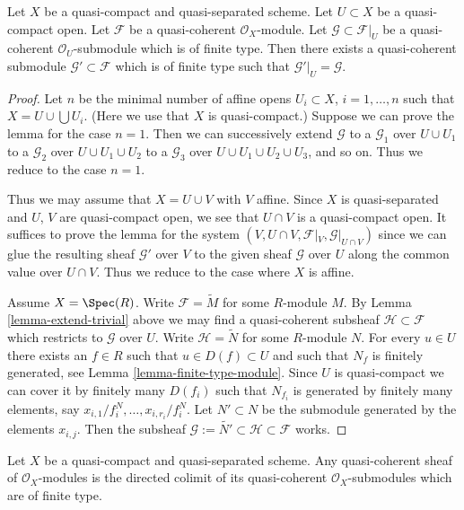 \begin{lemma}
\label{lemma-extend}
Let $X$ be a quasi-compact and quasi-separated scheme.
Let $U \subset X$ be a quasi-compact open.
Let $\mathcal{F}$ be a quasi-coherent $\mathcal{O}_X$-module.
Let $\mathcal{G} \subset \mathcal{F}|_U$ be a quasi-coherent
$\mathcal{O}_U$-submodule which is of finite type. Then
there exists a quasi-coherent submodule $\mathcal{G}' \subset \mathcal{F}$
which is of finite type such that $\mathcal{G}'|_U = \mathcal{G}$.
\end{lemma}

\begin{proof}
Let $n$ be the minimal number of affine opens $U_i \subset X$,
$i = 1, \ldots , n$ such that $X = U \cup \bigcup U_i$.
(Here we use that $X$ is quasi-compact.) Suppose
we can prove the lemma for the case $n = 1$. Then we can successively
extend $\mathcal{G}$
to a $\mathcal{G}_1$ over $U \cup U_1$
to a $\mathcal{G}_2$ over $U \cup U_1 \cup U_2$
to a $\mathcal{G}_3$ over $U \cup U_1 \cup U_2 \cup U_3$,
and so on.
Thus we reduce to the case $n = 1$.

\medskip\noindent
Thus we may assume that $X = U \cup V$ with $V$ affine.
Since $X$ is quasi-separated and $U$, $V$ are quasi-compact open,
we see that $U \cap V$ is a quasi-compact open. It suffices to prove the
lemma for the system $(V, U \cap V, \mathcal{F}|_V, \mathcal{G}|_{U \cap V})$
since we can glue the resulting sheaf $\mathcal{G}'$ over $V$
to the given sheaf $\mathcal{G}$ over $U$ along the common value
over $U \cap V$.
Thus we reduce to the case where $X$ is affine.

\medskip\noindent
Assume $X = \Spec(R)$. Write $\mathcal{F} = \widetilde M$
for some $R$-module $M$. By Lemma \ref{lemma-extend-trivial} above we may
find a quasi-coherent subsheaf $\mathcal{H} \subset \mathcal{F}$
which restricts to $\mathcal{G}$ over $U$.
Write $\mathcal{H} = \widetilde N$ for some $R$-module $N$.
For every $u \in U$ there exists an $f \in R$ such that
$u \in D(f) \subset U$ and such that $N_f$ is finitely generated,
see Lemma \ref{lemma-finite-type-module}.
Since $U$ is quasi-compact we can cover it by finitely
many $D(f_i)$ such that $N_{f_i}$ is generated by
finitely many elements, say $x_{i, 1}/f_i^N, \ldots, x_{i, r_i}/f_i^N$.
Let $N' \subset N$ be the submodule generated by the elements
$x_{i, j}$. Then the subsheaf
$\mathcal{G} := \widetilde{N'} \subset \mathcal{H} \subset \mathcal{F}$
works.
\end{proof}

\begin{lemma}
\label{lemma-quasi-coherent-colimit-finite-type}
Let $X$ be a quasi-compact and quasi-separated scheme.
Any quasi-coherent sheaf of $\mathcal{O}_X$-modules
is the directed colimit of its quasi-coherent
$\mathcal{O}_X$-submodules which are of finite type.
\end{lemma}

